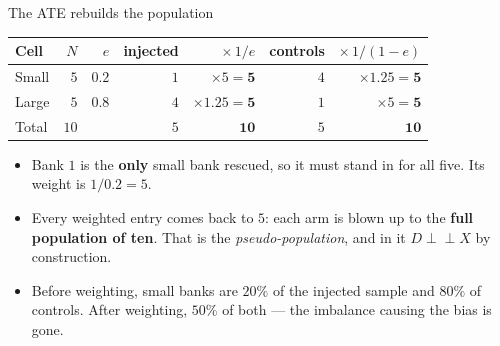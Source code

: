 \documentclass[
  11pt,
  ignorenonframetext,
  aspectratio=169,
]{beamer}
\providecommand{\tightlist}{%
  \setlength{\itemsep}{0pt}\setlength{\parskip}{0pt}}
\newcommand{\indep}{\perp\!\!\!\perp}
\begin{document}
\begin{frame}{The ATE rebuilds the population}
\protect{}\label{the-ate-rebuilds-the-population}
\begin{center}
\small
\begin{tabular}{lrrrrrr}
\toprule
Cell & $N$ & $e$ & injected & $\times\,1/e$ & controls & $\times\,1/(1-e)$ \\
\midrule
Small & $5$ & $0.2$ & $1$ & $\times 5 = \mathbf{5}$    & $4$ & $\times 1.25 = \mathbf{5}$ \\
Large & $5$ & $0.8$ & $4$ & $\times 1.25 = \mathbf{5}$ & $1$ & $\times 5 = \mathbf{5}$ \\
\midrule
Total & $10$ & & $5$ & $\mathbf{10}$ & $5$ & $\mathbf{10}$ \\
\bottomrule
\end{tabular}
\end{center}

\begin{itemize}
\tightlist
\item
  Bank \(1\) is the \textbf{only} small bank rescued, so it must stand
  in for all five. Its weight is \(1/0.2 = 5\).
\item
  Every weighted entry comes back to \(5\): each arm is blown up to the
  \textbf{full population of ten}. That is the \emph{pseudo-population},
  and in it \(D \indep X\) by construction.
\item
  Before weighting, small banks are \(20\%\) of the injected sample and
  \(80\%\) of controls. After weighting, \(50\%\) of both --- the
  imbalance causing the bias is gone.
\end{itemize}
\end{frame}
\end{document}
